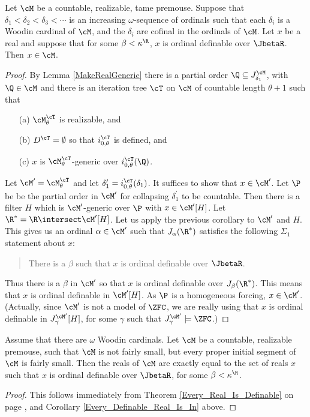\begin{corollary}
\label{Every_Definable_Real_Is_In}
Let $\cM$ be a countable, realizable, tame premouse. Suppose that
$\delta_1<\delta_2<\delta_3<\cdots$ is an increasing $\omega$-sequence of
ordinals such that each $\delta_i$ is a Woodin cardinal of $\cM$,
and the $\delta_i$ are cofinal in the ordinals of $\cM$.
Let $x$ be a real and suppose that for some
$\beta<\kappa^{\R}$, $x$ is
ordinal definable over $\JbetaR$.  Then
$x\in\cM$.
\end{corollary}
\begin{proof}
By Lemma \ref{MakeRealGeneric} there
is a partial order $\Q\subseteq J^{\cM}_{\delta_1}$, with
$\Q\in \cM$ and there is an
iteration tree $\cT$ on $\cM$ of countable length $\theta+1$ such that
\begin{itemize}
\item[(a)] $\cM^{\cT}_{\theta}$ is realizable, and
\item[(b)] $D^{\cT}=\emptyset$ so that $i^{\cT}_{0,\theta}$ is defined,
and
\item[(c)] $x$ is $\cM^{\cT}_{\theta}$-generic over
$i^{\cT}_{0,\theta}(\Q)$.
\end{itemize}
Let $\cM^{\prime}=\cM^{\cT}_{\theta}$ and let
$\delta_1^{\prime}=i^{\cT}_{0,\theta}(\delta_1)$. It suffices to show that
$x\in\cM^{\prime}$. Let $\P$ be be the partial order in $\cM^{\prime}$ for
collapsing $\delta_1^{\prime}$ to be countable. Then there is a filter $H$
which is $\cM^{\prime}$-generic over $\P$ with $x\in\cM^{\prime}[H]$.
Let $\R^*=\R\intersect\cM^{\prime}[H]$.
Let us apply the previous corollary to $\cM^{\prime}$ and $H$. This gives
us an ordinal $\alpha\in\cM^{\prime}$ such that $J_{\alpha}(\R^*)$ satisfies
the following $\Sigma_1$ statement about $x$:
\begin{quote}
There is a $\beta$ such that $x$ is ordinal definable over
$\JbetaR$.
\end{quote}
Thus there is a $\beta$ in $\cM^{\prime}$ so that $x$ is ordinal definable
over $J_{\beta}(\R^*)$. This means that $x$ is ordinal definable
in $\cM^{\prime}[H]$. As $\P$ is a homogeneous forcing, $x\in\cM^{\prime}$.
(Actually, since $\cM^{\prime}$ is not a model of $\ZFC$, we are really using
that $x$ is ordinal definable in $J_{\gamma}^{\cM^{\prime}}[H]$, for
some $\gamma$ such that $J_{\gamma}^{\cM^{\prime}}\models\ZFC$.)
\end{proof}


\begin{theorem}
Assume that there are $\omega$ Woodin cardinals. Let $\cM$ be a countable,
realizable premouse, such that $\cM$ is not fairly small, but every
proper initial segment of $\cM$ is fairly small. Then the reals of
$\cM$ are exactly equal to the set of reals $x$ such that $x$ is ordinal
definable over $\JbetaR$, for some $\beta<\kappa^{\R}$.
\end{theorem}
\begin{proof}
This follows immediately from Theorem \ref{Every_Real_Is_Definable}
on page \pageref{Every_Real_Is_Definable}, and
Corollary \ref{Every_Definable_Real_Is_In} above.
\end{proof}

